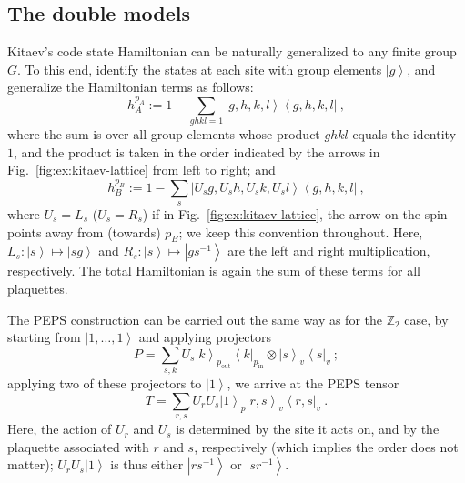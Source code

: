 \documentclass{article}
\newcommand{\ket}[1]{\left|#1\right\rangle}
\newcommand{\bra}[1]{\left\langle#1\right|}
\theoremstyle{plain}
\theoremstyle{definition}
\numberwithin{equation}{section}  %
\begin{document}
\subsection{The double models}


Kitaev's code state Hamiltonian can be naturally generalized to any finite
group $G$.  To this end, identify the states at each site with group
elements $\ket{g}$, and generalize the Hamiltonian terms as follows:
\begin{equation}
    h^{p_A}_A:=1-\sum_{ghkl=1}\ket{g,h,k,l}\bra{g,h,k,l}\ ,
\end{equation}
where the sum is over all  group elements whose product $ghkl$ equals the
identity $1$, and the product is taken in the order indicated by the
arrows in Fig.~\ref{fig:ex:kitaev-lattice} from left to right; and
\begin{equation}
    h^{p_B}_B := 1-\sum_s \ket{U_sg,U_sh,U_sk,U_sl}\bra{g,h,k,l}\ ,
\end{equation}
where $U_s=L_s$ ($U_s=R_s$) if in Fig.~\ref{fig:ex:kitaev-lattice}, the
arrow on the spin points away from (towards) $p_B$; we keep this
convention throughout.  Here, $L_s:\ket{s}\mapsto \ket{sg}$ and
$R_s:\ket{s}\mapsto\ket{gs^{-1}}$ are the left and right multiplication,
respectively. The total Hamiltonian is again the sum of these terms for
all plaquettes.

The PEPS construction can be carried out the same way as for the $\mathbb
    Z_2$ case, by starting from $\ket{1,\dots,1}$ and applying projectors
\begin{equation}
    P=\sum_{s,k}U_s\ket{k}_{p_\mathrm{out}}\bra{k}_{p_\mathrm{in}}
    \otimes\ket{s}_v\bra{s}_{v}\ ;
\end{equation}
applying two of these projectors to $\ket{1}$, we arrive at
the PEPS tensor
\begin{equation}
    T =  \sum_{r,s}U_rU_s\ket{1}_p\ket{r,s}_{v}\bra{r,s}_{v}\ .
\end{equation}
Here, the action of $U_r$ and $U_s$ is determined by the site it acts on,
and by the plaquette associated with $r$ and $s$, respectively (which
implies the order does not matter); $U_rU_s\ket1$ is thus either
$\ket{rs^{-1}}$ or $\ket{sr^{-1}}$.
\end{document}
